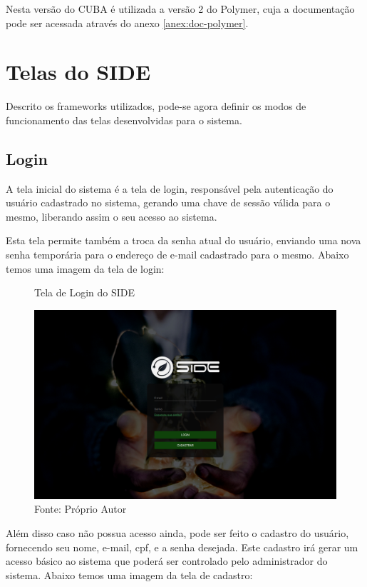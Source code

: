 Nesta versão do CUBA é utilizada a versão 2 do Polymer, cuja a documentação pode ser acessada através do anexo \ref{anex:doc-polymer}.

\section{Telas do SIDE}

Descrito os frameworks utilizados, pode-se agora definir os modos de funcionamento das telas desenvolvidas para o sistema. 

\subsection{Login}

A tela inicial do sistema é a tela de login, responsável pela autenticação do usuário cadastrado no sistema, gerando uma chave de sessão válida para o mesmo, liberando assim o seu acesso ao sistema.

Esta tela permite também a troca da senha atual do usuário, enviando uma nova senha temporária para o endereço de e-mail cadastrado para o mesmo. Abaixo temos uma imagem da tela de login:

\begin{figure}[H]
    \centering
    \caption{Tela de Login do SIDE}
\includegraphics[width=\linewidth]{imagens/side/side-login.png}
    \caption*{Fonte: Próprio Autor}
    \label{fig:side-login}
\end{figure}


Além disso caso não possua acesso ainda, pode ser feito o cadastro do usuário, fornecendo seu nome, e-mail, cpf, e a senha desejada. Este cadastro irá gerar um acesso básico ao sistema que poderá ser controlado pelo administrador do sistema. Abaixo temos uma imagem da tela de cadastro:

